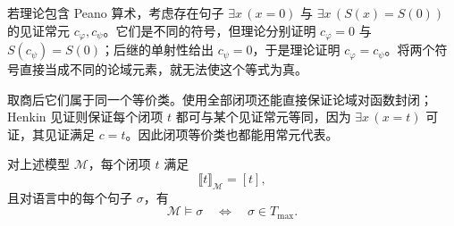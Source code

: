 \documentclass[lang=cn,a4paper,fontset=none,zihao=false,10pt,openany,twoside]{beautybook}
\numberwithin{algorithm}{chapter}
\begin{document}
\begin{remark}[为什么需要取商]
若理论包含 Peano 算术，考虑存在句子 $\exists x\,(x=0)$ 与 $\exists x\,(S(x)=S(0))$ 的见证常元 $c_\varphi,c_\psi$。它们是不同的符号，但理论分别证明 $c_\varphi=0$ 与 $S(c_\psi)=S(0)$；后继的单射性给出 $c_\psi=0$，于是理论证明 $c_\varphi=c_\psi$。将两个符号直接当成不同的论域元素，就无法使这个等式为真。

取商后它们属于同一个等价类。使用全部闭项还能直接保证论域对函数封闭；Henkin 见证则保证每个闭项 $t$ 都可与某个见证常元等同，因为 $\exists x\,(x=t)$ 可证，其见证满足 $c=t$。因此闭项等价类也都能用常元代表。
\end{remark}

\Needspace{45mm}
\begin{lemma}[闭项模型的真值引理]\label{lem:fo-truth}
对上述模型 $\mathcal M$，每个闭项 $t$ 满足
\[
 \llbracket t\rrbracket_{\mathcal M}=[t],
\]
且对语言中的每个句子 $\sigma$，有
\[
 \mathcal M\models\sigma\quad\Longleftrightarrow\quad\sigma\in T_{\max}.
\]
\end{lemma}
\end{document}
